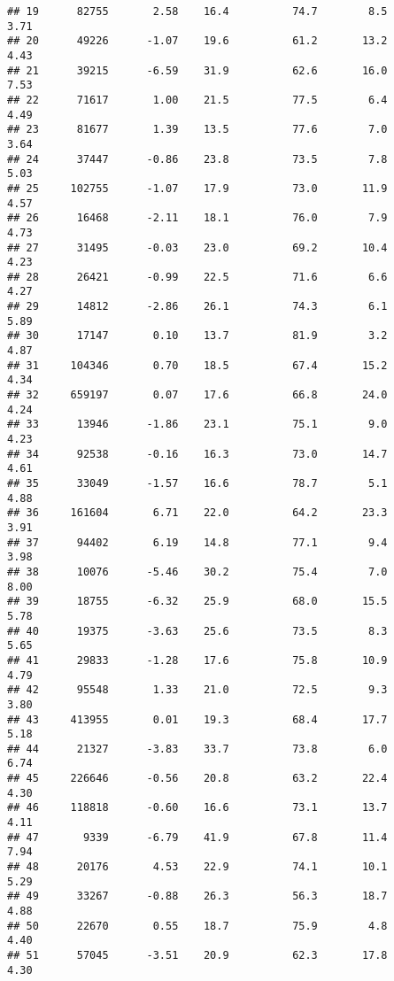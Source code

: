 \documentclass[
]{article}
\begin{document}
\begin{verbatim}
## 19      82755       2.58    16.4          74.7        8.5              3.71
## 20      49226      -1.07    19.6          61.2       13.2              4.43
## 21      39215      -6.59    31.9          62.6       16.0              7.53
## 22      71617       1.00    21.5          77.5        6.4              4.49
## 23      81677       1.39    13.5          77.6        7.0              3.64
## 24      37447      -0.86    23.8          73.5        7.8              5.03
## 25     102755      -1.07    17.9          73.0       11.9              4.57
## 26      16468      -2.11    18.1          76.0        7.9              4.73
## 27      31495      -0.03    23.0          69.2       10.4              4.23
## 28      26421      -0.99    22.5          71.6        6.6              4.27
## 29      14812      -2.86    26.1          74.3        6.1              5.89
## 30      17147       0.10    13.7          81.9        3.2              4.87
## 31     104346       0.70    18.5          67.4       15.2              4.34
## 32     659197       0.07    17.6          66.8       24.0              4.24
## 33      13946      -1.86    23.1          75.1        9.0              4.23
## 34      92538      -0.16    16.3          73.0       14.7              4.61
## 35      33049      -1.57    16.6          78.7        5.1              4.88
## 36     161604       6.71    22.0          64.2       23.3              3.91
## 37      94402       6.19    14.8          77.1        9.4              3.98
## 38      10076      -5.46    30.2          75.4        7.0              8.00
## 39      18755      -6.32    25.9          68.0       15.5              5.78
## 40      19375      -3.63    25.6          73.5        8.3              5.65
## 41      29833      -1.28    17.6          75.8       10.9              4.79
## 42      95548       1.33    21.0          72.5        9.3              3.80
## 43     413955       0.01    19.3          68.4       17.7              5.18
## 44      21327      -3.83    33.7          73.8        6.0              6.74
## 45     226646      -0.56    20.8          63.2       22.4              4.30
## 46     118818      -0.60    16.6          73.1       13.7              4.11
## 47       9339      -6.79    41.9          67.8       11.4              7.94
## 48      20176       4.53    22.9          74.1       10.1              5.29
## 49      33267      -0.88    26.3          56.3       18.7              4.88
## 50      22670       0.55    18.7          75.9        4.8              4.40
## 51      57045      -3.51    20.9          62.3       17.8              4.30

\end{verbatim}
\end{document}
